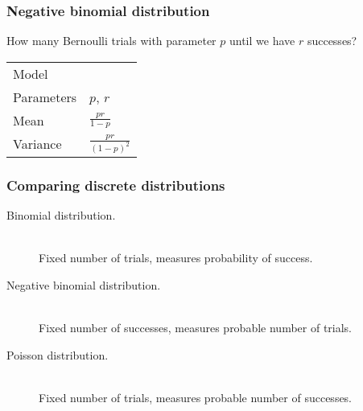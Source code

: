 \documentclass[t]{beamer}
\begin{document}
\begin{frame}
  \frametitle{Negative binomial distribution}

  How many Bernoulli trials with parameter $p$ until we have $r$
  successes?

  \begin{tabular}{ll}
    Model & \\[1mm]
    Parameters & $p$, $r$\\[1mm]
    Mean & $\frac{pr}{1-p}$\\[1mm]
    Variance & $\frac{pr}{(1-p)^2}$
  \end{tabular}

\end{frame}

\begin{frame}
  \frametitle{Comparing discrete distributions}

  \begin{description}
  \item[Binomial distribution.] \hfill \\
    Fixed number of trials, measures probability of success.
  \item[Negative binomial distribution.] \hfill \\
    Fixed number of successes, measures probable number of trials.
  \item[Poisson distribution.] \hfill \\
    Fixed number of trials, measures probable number of successes.
  \end{description}

\end{frame}
\end{document}
